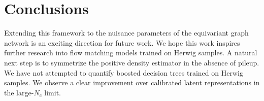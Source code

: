 \section{Conclusions}\label{sec:conclusions}

Extending this framework to the nuisance parameters of the equivariant
graph network is an exciting direction for future work. We hope this
work inspires further research into flow matching models trained on
Herwig samples. A natural next step is to symmetrize the positive
density estimator in the absence of pileup. We have not attempted to
quantify boosted decision trees trained on Herwig samples. We observe a
clear improvement over calibrated latent representations in the
large-$N_c$ limit.


